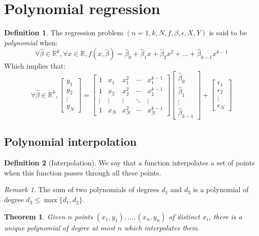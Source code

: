\documentclass{article}
\newtheorem{theorem}{Theorem}[section]
\theoremstyle{definition}
\newtheorem{definition}{Definition}[section]
\theoremstyle{remark}
\newtheorem*{remark}{Remark}
\theoremstyle{example}
\newcommand{\betat}{\hat{\beta}}
\newcommand{\fvector}[2]{\begin{bmatrix} #1_1 \\ #1_2 \\ \vdots \\ #1_{#2} \end{bmatrix}}
\begin{document}
\section{Polynomial regression}

\begin{definition}
		The regression problem $(n=1, k, N, f, \beta, \epsilon, X, Y)$ is said to be \textit{polynomial} when:
				$$\forall \betat \in \mathbb{R}^k, \forall x \in \mathbb{R}, f(x, \betat) = \betat_0 + \betat_1 x + \betat_2 x^2 + \dots + \betat_{k-1} x^{k-1}$$
		Which implies that:
		$$\forall \betat \in \mathbb{R}^k, \fvector{y}{N} = \begin{bmatrix} 1 & x_1 & x_1^2 & \cdots & x_1^{k-1} \\ 1 & x_2 & x_2^2 & \cdots & x_2^{k-1} \\ \vdots & \vdots & \vdots & \ddots & \vdots \\ 1 & x_N & x_N^2 & \cdots & x_N^{k-1} \end{bmatrix} \begin{bmatrix} \betat_0 \\ \betat_1 \\ \vdots \\ \betat_{k-1} \end{bmatrix} + \fvector{\epsilon}{N}$$
\end{definition}

\subsection{Polynomial interpolation}

\begin{definition}[Interpolation]
    We say that a function interpolates a set of points when this function passes through all these points.
\end{definition}

\begin{remark}
    The sum of two polynomials of degrees $d_1$ and $d_2$ is a polynomial of degree $d_3 \leq \max \{d_1, d_2\}$.
\end{remark}

\begin{theorem}
    Given $n$ points $(x_1, y_1), \dots, (x_n, y_n)$ of distinct $x_i$, there is a unique polynomial of degree at most $n$ which interpolates them.
\end{theorem}
\end{document}
